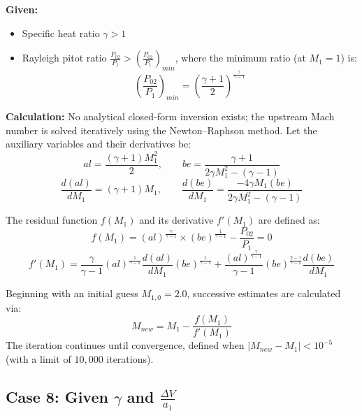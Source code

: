 \textbf{Given:}
\begin{itemize}[nosep]
    \item Specific heat ratio $\gamma > 1$
    \item Rayleigh pitot ratio $\frac{P_{02}}{P_1} > \left(\frac{P_{02}}{P_1}\right)_{min}$, where the minimum ratio (at $M_1=1$) is:
    \begin{equation}
    \left(\frac{P_{02}}{P_1}\right)_{min} = \left(\frac{\gamma+1}{2}\right)^{\frac{\gamma}{\gamma-1}}
    \end{equation}
\end{itemize}

\textbf{Calculation:} No analytical closed-form inversion exists; the upstream Mach number is solved iteratively using the Newton--Raphson method. Let the auxiliary variables and their derivatives be:
\begin{equation}
al = \frac{(\gamma+1)M_1^2}{2}, \qquad be = \frac{\gamma+1}{2\gamma M_1^2-(\gamma-1)}
\end{equation}
\begin{equation}
\frac{d(al)}{dM_1} = (\gamma+1)M_1, \qquad \frac{d(be)}{dM_1} = \frac{-4\gamma M_1(be)}{2\gamma M_1^2-(\gamma-1)}
\end{equation}

The residual function $f(M_1)$ and its derivative $f'(M_1)$ are defined as:
\begin{equation}
f(M_1) = (al)^{\frac{\gamma}{\gamma-1}}\times(be)^{\frac{1}{\gamma-1}} - \frac{P_{02}}{P_1} = 0
\end{equation}
\begin{equation}
f'(M_1) = \frac{\gamma}{\gamma-1}(al)^{\frac{1}{\gamma-1}}\frac{d(al)}{dM_1}(be)^{\frac{1}{\gamma-1}} + \frac{(al)^{\frac{\gamma}{\gamma-1}}}{\gamma-1}(be)^{\frac{2-\gamma}{\gamma-1}}\frac{d(be)}{dM_1}
\end{equation}

Beginning with an initial guess $M_{1,0} = 2.0$, successive estimates are calculated via:
\begin{equation}
M_{new} = M_1 - \frac{f(M_1)}{f'(M_1)}
\end{equation}
The iteration continues until convergence, defined when $|M_{new} - M_1| < 10^{-5}$ (with a limit of $10{,}000$ iterations).


\subsection*{Case 8: Given $\gamma$ and $\frac{\Delta V}{a_1}$}

